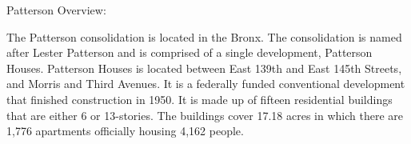 Patterson Overview:

The Patterson consolidation is located in the Bronx. The consolidation is named after Lester Patterson and is comprised of a single development, Patterson Houses. Patterson Houses is located between East 139th and East 145th Streets, and Morris and Third Avenues. It is a federally funded conventional development that finished construction in 1950. It is made up of fifteen residential buildings that are either 6 or 13-stories. The buildings cover 17.18 acres in which there are 1,776 apartments officially housing 4,162 people.